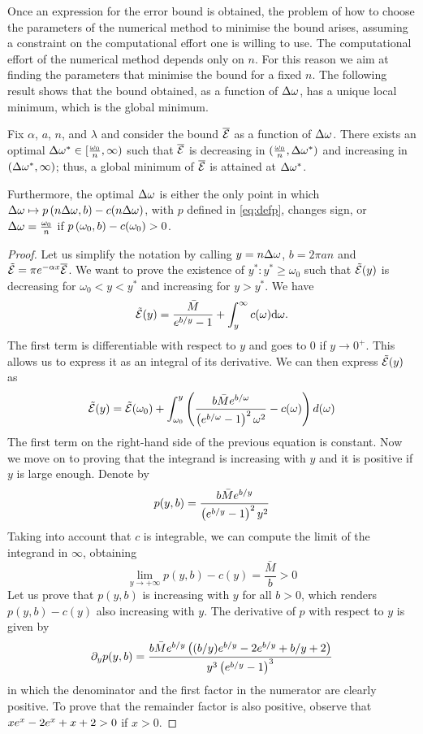 \documentclass[11pt]{amsart}
\begin{document}
Once an expression for the error bound is obtained, the problem of 
how to choose the parameters of the numerical method to minimise the bound arises, 
assuming a constraint on the computational effort one is willing to use. 
The computational effort of the numerical method depends
only on  $n$. For this reason we aim at finding the parameters that
minimise the bound for a fixed $n$.
The following result shows that the bound obtained, as a function of $\Delta\omega$, 
has a unique local minimum, which is the global minimum.
\begin{proposition}
Fix $\alpha$, $a$, $n$, and $\lambda$ and consider the bound $\overline {\mathcal{E}}$ as a
function of $\Delta\omega$. There exists an optimal $\Delta\omega^*\in [\frac{\omega_0}{n},\infty)$ such that $\overline {\mathcal{E}}$ is
decreasing in $(\frac{\omega_0}{n},\Delta\omega^*)$ and increasing in
$(\Delta\omega^*,\infty)$; thus, a global minimum of $\overline {\mathcal{E}}$ is attained at $\Delta\omega^*$. 

Furthermore, the optimal $\Delta\omega$ is either the only point in which 
$\Delta\omega\mapsto p\left( {n\Delta\omega,b} \right)-c(n\Delta\omega)$, with $p$ defined in \eqref{eq:defp}, changes sign, or $\Delta\omega=\frac{\omega_0}{n}$ if $p\left( {\omega_0,b} \right)-c(\omega_0)>0$.

\begin{proof}
Let us simplify the notation by calling $y=n\Delta\omega$, $b=2 \pi a n$ and $\tilde{\mathcal{E}}=\pi e^{-\alpha x}\overline {\mathcal{E}}$. We want to prove the existence of $y^*\colon y^*\geq \omega_0$ such that $\tilde{\mathcal{E}}(y)$ is decreasing for $\omega_0<y< y^*$ and increasing for $y> y^*$. We have 
$$\tilde{\mathcal{E}}(y)=\frac{\bar{M}}{e^{b/y}-1} +  \int_{y}^{\infty} c(\omega) \textrm{d}\omega.$$
The first term is differentiable with respect to $y$ and goes to 0 if $y\to 0^+$. This allows us to express it as an integral of its derivative. We can then express $\tilde{\mathcal{E}}(y)$ as 
$$\tilde{\mathcal{E}}(y)=\tilde{\mathcal{E}}(\omega_0) + \int_{\omega_0}^y \left( {\frac{b \bar{M} e^{b/\omega}}{\left( {e^{b/\omega}-1} \right)^2 \omega^2}-c(\omega)} \right)d(\omega)$$
The first term on the right-hand side of the previous equation is constant. Now we move on to proving that the integrand is increasing with $y$ and it is positive if $y$ is large enough. Denote by
\begin{equation}\label{eq:defp}
p(y,b)=\frac{b \bar{M} e^{b/y}}{\left( {e^{b/y}-1} \right)^2 y^2}
\end{equation}
Taking into account that $c$ is integrable, we can compute the limit of the integrand in $\infty$, obtaining
\begin{equation*}
\lim_{y \to +\infty}p(y,b)-c(y)=\frac{\bar{M}}{b}>0
\end{equation*} 
Let us prove that $p(y,b)$ is increasing with $y$ for all $b>0$, which renders $p(y,b)-c(y)$ also increasing with $y$. The derivative of $p$ with respect to $y$ is given by
$$\partial_{y} p(y,b)=\frac{b\bar{M}e^{b/y}\left( {(b/y)e^{b/y}-2e^{b/y}+b/y+2} \right)}{y^3\left( {e^{b/y}-1} \right)^3}$$
in which the denominator and the first factor in the numerator are clearly positive. To prove that the remainder factor is also positive, observe that 
$xe^{x}-2e^{x}+x+2>0$ if $x>0$.

\end{proof}
\end{proposition}
\end{document}
